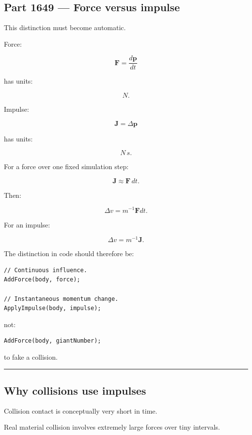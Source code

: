 \subsection{Part 1649 --- Force versus impulse}\label{06-engine-ii-ch036-part-1649-force-versus-impulse}

This distinction must become automatic.

Force:

\[
\boxed{
\mathbf F
=
\frac{d\mathbf p}{dt}
}
\]

has units:

\[
N.
\]

Impulse:

\[
\boxed{
\mathbf J
=
\Delta\mathbf p
}
\]

has units:

\[
N\,s.
\]

For a force over one fixed simulation step:

\[
\mathbf J
\approx
\mathbf F\,dt.
\]

Then:

\[
\Delta v
=
m^{-1}\mathbf Fdt.
\]

For an impulse:

\[
\Delta v
=
m^{-1}\mathbf J.
\]

The distinction in code should therefore be:

\begin{verbatim}
// Continuous influence.
AddForce(body, force);

// Instantaneous momentum change.
ApplyImpulse(body, impulse);
\end{verbatim}

not:

\begin{verbatim}
AddForce(body, giantNumber);
\end{verbatim}

to fake a collision.

\begin{center}\rule{0.5\linewidth}{0.5pt}\end{center}

\subsection{Why collisions use impulses}\label{06-engine-ii-ch036-why-collisions-use-impulses}

Collision contact is conceptually very short in time.

Real material collision involves extremely large forces over tiny intervals.

